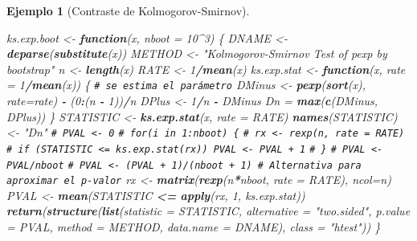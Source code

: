 \documentclass[
]{book}
\newenvironment{Shaded}{\begin{snugshade}}{\end{snugshade}}
\newcommand{\AttributeTok}[1]{\textcolor[rgb]{0.13,0.29,0.53}{#1}}
\newcommand{\CommentTok}[1]{\textcolor[rgb]{0.56,0.35,0.01}{\textit{#1}}}
\newcommand{\ControlFlowTok}[1]{\textcolor[rgb]{0.13,0.29,0.53}{\textbf{#1}}}
\newcommand{\DecValTok}[1]{\textcolor[rgb]{0.00,0.00,0.81}{#1}}
\newcommand{\FunctionTok}[1]{\textcolor[rgb]{0.13,0.29,0.53}{\textbf{#1}}}
\newcommand{\NormalTok}[1]{#1}
\newcommand{\OtherTok}[1]{\textcolor[rgb]{0.56,0.35,0.01}{#1}}
\newcommand{\SpecialCharTok}[1]{\textcolor[rgb]{0.81,0.36,0.00}{\textbf{#1}}}
\newcommand{\StringTok}[1]{\textcolor[rgb]{0.31,0.60,0.02}{#1}}
\theoremstyle{break}
\newtheorem{example}{Ejemplo}[chapter]
\theoremstyle{nonumberplain}
\renewcommand{\CommentTok}[1]{\textcolor[rgb]{0.41,0.41,0.41}{\texttt{#1}}}
\begin{document}
\begin{example}[Contraste de Kolmogorov-Smirnov]
\begin{Shaded}
\begin{Highlighting}[]
\NormalTok{ks.exp.boot }\OtherTok{\textless{}{-}} \ControlFlowTok{function}\NormalTok{(x, }\AttributeTok{nboot =} \DecValTok{10}\SpecialCharTok{\^{}}\DecValTok{3}\NormalTok{) \{}
\NormalTok{  DNAME }\OtherTok{\textless{}{-}} \FunctionTok{deparse}\NormalTok{(}\FunctionTok{substitute}\NormalTok{(x))}
\NormalTok{  METHOD }\OtherTok{\textless{}{-}} \StringTok{"Kolmogorov{-}Smirnov Test of pexp by bootstrap"} 
\NormalTok{  n }\OtherTok{\textless{}{-}} \FunctionTok{length}\NormalTok{(x)}
\NormalTok{  RATE }\OtherTok{\textless{}{-}} \DecValTok{1}\SpecialCharTok{/}\FunctionTok{mean}\NormalTok{(x)}
\NormalTok{  ks.exp.stat }\OtherTok{\textless{}{-}} \ControlFlowTok{function}\NormalTok{(x, }\AttributeTok{rate =} \DecValTok{1}\SpecialCharTok{/}\FunctionTok{mean}\NormalTok{(x)) \{ }\CommentTok{\# se estima el parámetro}
\NormalTok{    DMinus }\OtherTok{\textless{}{-}} \FunctionTok{pexp}\NormalTok{(}\FunctionTok{sort}\NormalTok{(x), }\AttributeTok{rate=}\NormalTok{rate) }\SpecialCharTok{{-}}\NormalTok{ (}\DecValTok{0}\SpecialCharTok{:}\NormalTok{(n }\SpecialCharTok{{-}} \DecValTok{1}\NormalTok{))}\SpecialCharTok{/}\NormalTok{n}
\NormalTok{    DPlus }\OtherTok{\textless{}{-}} \DecValTok{1}\SpecialCharTok{/}\NormalTok{n }\SpecialCharTok{{-}}\NormalTok{ DMinus}
\NormalTok{    Dn }\OtherTok{=} \FunctionTok{max}\NormalTok{(}\FunctionTok{c}\NormalTok{(DMinus, DPlus))}
\NormalTok{  \}  }
\NormalTok{  STATISTIC }\OtherTok{\textless{}{-}} \FunctionTok{ks.exp.stat}\NormalTok{(x, }\AttributeTok{rate =}\NormalTok{ RATE) }
  \FunctionTok{names}\NormalTok{(STATISTIC) }\OtherTok{\textless{}{-}} \StringTok{"Dn"}
  \CommentTok{\# PVAL \textless{}{-} 0}
  \CommentTok{\# for(i in 1:nboot) \{}
  \CommentTok{\#   rx \textless{}{-} rexp(n, rate = RATE)}
  \CommentTok{\#   if (STATISTIC \textless{}= ks.exp.stat(rx)) PVAL \textless{}{-} PVAL + 1}
  \CommentTok{\# \}}
  \CommentTok{\# PVAL \textless{}{-} PVAL/nboot}
  \CommentTok{\# PVAL \textless{}{-} (PVAL + 1)/(nboot + 1) \# Alternativa para aproximar el p{-}valor}
\NormalTok{  rx }\OtherTok{\textless{}{-}} \FunctionTok{matrix}\NormalTok{(}\FunctionTok{rexp}\NormalTok{(n}\SpecialCharTok{*}\NormalTok{nboot, }\AttributeTok{rate =}\NormalTok{ RATE), }\AttributeTok{ncol=}\NormalTok{n)}
\NormalTok{  PVAL }\OtherTok{\textless{}{-}} \FunctionTok{mean}\NormalTok{(STATISTIC }\SpecialCharTok{\textless{}=} \FunctionTok{apply}\NormalTok{(rx, }\DecValTok{1}\NormalTok{, ks.exp.stat))}
  \FunctionTok{return}\NormalTok{(}\FunctionTok{structure}\NormalTok{(}\FunctionTok{list}\NormalTok{(}\AttributeTok{statistic =}\NormalTok{ STATISTIC, }\AttributeTok{alternative =} \StringTok{"two.sided"}\NormalTok{, }
                   \AttributeTok{p.value =}\NormalTok{ PVAL, }\AttributeTok{method =}\NormalTok{ METHOD, }\AttributeTok{data.name =}\NormalTok{ DNAME), }
                   \AttributeTok{class =} \StringTok{"htest"}\NormalTok{))}
\NormalTok{\}}
\end{Highlighting}
\end{Shaded}


\end{example}
\end{document}
